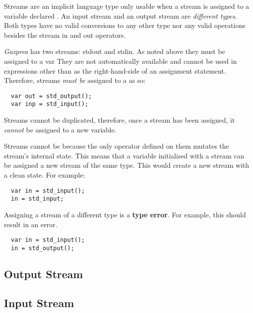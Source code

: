 \documentclass[../../gazprea.tex]{subfiles}
\begin{document}
Streams are an implicit language type only usable when a stream is assigned to a variable declared
. An input stream and an output stream are \textit{different types}. Both types have no
valid conversions to any other type nor any valid operations besides the stream in and out
operators.

\textit{Gazprea} has two streams: stdout and stdin. As noted above they must be assigned to a var
They are not automatically available and cannot be used in expressions other than as the
right-hand-side of an assignment statement. Therefore, streams \textit{must be} assigned to a
 as so:
\begin{lstlisting}
  var out = std_output();
  var inp = std_input();
\end{lstlisting}

Streams cannot be duplicated, therefore, once a stream has been assigned, it \textit{cannot} be
assigned to a new variable.

Streams cannot be  because the only operator defined on them mutates the stream's
internal state. This means that a variable initialised with a stream can be assigned a new stream of
the same type. This would create a new stream with a clean state. For example:
\begin{lstlisting}
  var in = std_input();
  in = std_input;
\end{lstlisting}

Assigning a stream of a different type is a \textbf{type error}. For example, this should result in
an error.
\begin{lstlisting}
  var in = std_input();
  in = std_output();
\end{lstlisting}

\subsection{Output Stream}
\label{ssec:output}


\subsection{Input Stream}
\label{ssec:input}

\end{document}
